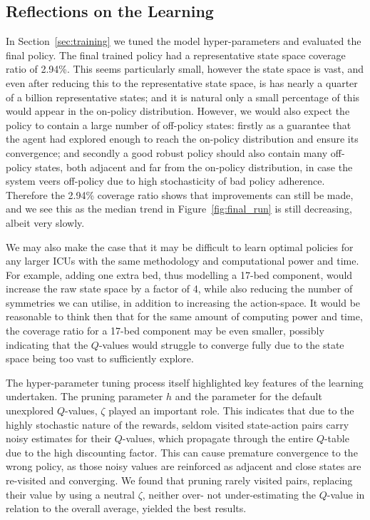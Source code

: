 \documentclass{article}
\begin{document}
\subsection{Reflections on the Learning}\label{sec:reflections}
In Section~\ref{sec:training} we tuned the model hyper-parameters and evaluated
the final policy.
The final trained policy had a representative state space coverage ratio of
2.94\%.
This seems particularly small, however the state space is vast, and even after
reducing this to the representative state space, is has nearly a quarter of a
billion representative states; and it is natural only a small percentage of this
would appear in the on-policy distribution.
However, we would also expect the policy to contain a large number of off-policy
states: firstly as a guarantee that the agent had explored enough to reach the
on-policy distribution and ensure its convergence; and secondly a good robust
policy should also contain many off-policy states, both adjacent and far from
the on-policy distribution, in case the system veers off-policy due to high
stochasticity of bad policy adherence.
Therefore the 2.94\% coverage ratio shows that improvements can still be made,
and we see this as the median trend in Figure~\ref{fig:final_run} is still
decreasing, albeit very slowly.

We may also make the case that it may be difficult to learn optimal policies for
any larger ICUs with the same methodology and computational power and time.
For example, adding one extra bed, thus modelling a 17-bed component, would
increase the raw state space by a factor of 4, while also reducing the number of
symmetries we can utilise, in addition to increasing the action-space.
It would be reasonable to think then that for the same amount of computing power
and time, the coverage ratio for a 17-bed component may be even smaller,
possibly indicating that the $Q$-values would struggle to converge fully due to
the state space being too vast to sufficiently explore.

The hyper-parameter tuning process itself highlighted key features of the
learning undertaken.
The pruning parameter $h$ and the parameter for the default unexplored
$Q$-values, $\zeta$ played an important role.
This indicates that due to the highly stochastic nature of the rewards, seldom
visited state-action pairs carry noisy estimates for their $Q$-values, which
propagate through the entire $Q$-table due to the high discounting factor.
This can cause premature convergence to the wrong policy, as those noisy values
are reinforced as adjacent and close states are re-visited and converging.
We found that pruning rarely visited pairs, replacing their value by using a
neutral $\zeta$, neither over- not under-estimating the $Q$-value in relation to
the overall average, yielded the best results.
\end{document}
